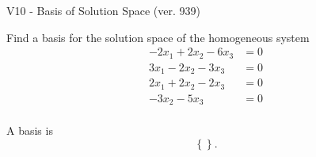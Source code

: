 \begin{exercise}
  \begin{exerciseTitle}V10 - Basis of Solution Space (ver. 939)\end{exerciseTitle}
  \begin{exerciseStatement}
    Find a basis for the solution space of the homogeneous system 
\begin{align*}
 -2 x_ 1 + 2 x_ 2 -6 x_ 3 &= 0  \\ 
  3 x_ 1 -2 x_ 2 -3 x_ 3 &= 0  \\ 
  2 x_ 1 + 2 x_ 2 -2 x_ 3 &= 0  \\ 
  -3 x_ 2 -5 x_ 3 &= 0  \\ 
 \end{align*}


 
  \end{exerciseStatement}

  \begin{exerciseAnswer}
   A basis is   
\[\left\{\right\}.\]

  


  \end{exerciseAnswer}
\end{exercise}